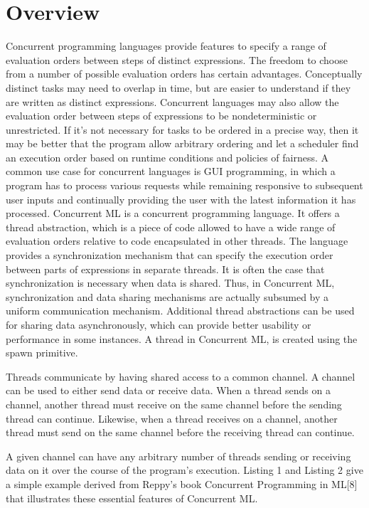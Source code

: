 \section{Overview}
Concurrent programming languages provide features to specify a range of evaluation orders
between steps of distinct expressions.  The freedom to choose from a number of possible
evaluation orders has certain advantages.  Conceptually distinct tasks may need to overlap in
time, but are easier to understand if they are written as distinct expressions.  Concurrent
languages may also allow the evaluation order between steps of expressions to be
nondeterministic or unrestricted.  If it's not necessary for tasks to be ordered in a precise
way, then it may be better that the program allow arbitrary ordering and let a scheduler find
an execution order based on runtime conditions and policies of fairness.  A common use case for
concurrent languages is GUI programming, in which a program has to process various requests
while remaining responsive to subsequent user inputs and continually providing the user with
the latest information it has processed. Concurrent ML is a concurrent programming language.
It offers a thread abstraction, which is a piece of code allowed to have a wide range of
evaluation orders relative to code encapsulated in other threads.  The language provides a
synchronization mechanism that can specify the execution order between parts of expressions in
separate threads.  It is often the case that synchronization is necessary when data is shared.
Thus, in Concurrent ML, synchronization and data sharing mechanisms are actually subsumed by a
uniform communication mechanism.  Additional thread abstractions can be used for sharing data
asynchronously, which can provide better usability or performance in some instances. A thread
in Concurrent ML, is created using the spawn primitive.

Threads communicate by having shared access to a common channel.  A channel can be used to
either send data or receive data.  When a thread sends on a channel, another thread must
receive on the same channel before the sending thread can continue.  Likewise, when a thread
receives on a channel, another thread must send on the same channel before the receiving thread
can continue.

A given channel can have any arbitrary number of threads sending or receiving data on it over
the course of the program's execution.  Listing 1 and Listing 2 give a simple example derived
from Reppy's book Concurrent Programming in ML[8] that illustrates these essential features of
Concurrent ML.

